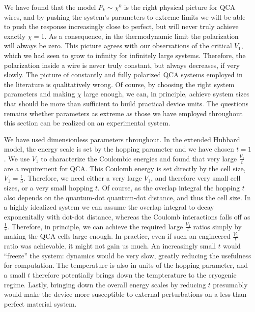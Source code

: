 We have found that the model $P_k \sim \chi^k$ is the right physical picture for
QCA wires, and by pushing the system's parameters to extreme limits we will be
able to push the response increasingly close to perfect, but will never truly
achieve exactly $\chi = 1$. As a consequence, in the thermodynamic limit the
polarization will always be zero. This picture agrees with our observations of
the critical $V_1$, which we had seen to grow to infinity for infinitely large
systems. Therefore, the polarization inside a wire is never truly constant, but
always decreases, if very slowly. The picture of constantly and fully polarized
QCA systems employed in the literature is qualitatively wrong. Of course, by
choosing the right system parameters and making $\chi$ large enough, we can, in
principle, achieve system sizes that should be more than sufficient to build
practical device units. The questions remains whether parameters as extreme as
those we have employed throughout this section can be realized on an
experimental system.

We have used dimensionless parameters throughout. In the extended Hubbard model,
the energy scale is set by the hopping parameter and we have chosen $t = 1$. We
use $V_1$ to characterize the Coulombic energies and found that very large
$\frac{V_1}{t}$ are a requirement for QCA. This Coulomb energy is set directly
by the cell size, $V_1 = \frac{1}{a}$. Therefore, we need either a very large
$V_1$, and therefore very small cell sizes, or a very small hopping $t$. Of
course, as the overlap integral the hopping $t$ also depends on the quantum-dot
quantum-dot distance, and thus the cell size. In a highly idealized system we
can assume the overlap integral to decay exponenitally with dot-dot distance,
whereas the Coulomb interactions falls off as $\frac{1}{r}$. Therefore, in
principle, we can achieve the required large $\frac{V_1}{t}$ ratios simply by
making the QCA cells large enough. In practice, even if such an engineered
$\frac{V_1}{t}$ ratio was achievable, it might not gain us much. An increasingly
small $t$ would ``freeze'' the system: dynamics would be very slow, greatly
reducing the usefulness for computation. The temperature is also in units of the
hopping parameter, and a small $t$ therefore potentially brings down the
tempterature to the cryogenic regime. Lastly, bringing down the overall energy
scales by reducing $t$ presumably would make the device more susceptible to
external perturbations on a less-than-perfect material system.

